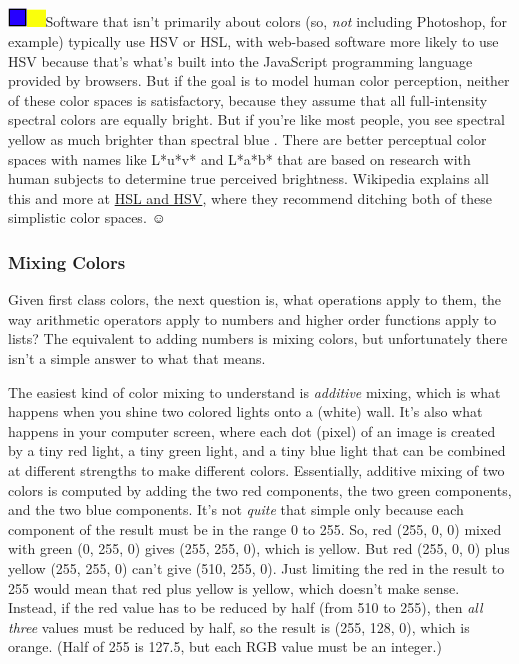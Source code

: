 \includegraphics[width=0.20278in,height=0.20278in]{media/image1205.png}\includegraphics[width=0.18889in,height=0.18889in]{media/image1206.png}Software
that isn't primarily about colors (so, \emph{not} including Photoshop,
for example) typically use HSV or HSL, with web-based software more
likely to use HSV because that's what's built into the JavaScript
programming language provided by browsers. But if the goal is to model
human color perception, neither of these color spaces is satisfactory,
because they assume that all full-intensity spectral colors are equally
bright. But if you're like most people, you see spectral yellow as much
brighter than spectral blue . There are better perceptual color spaces
with names like L*u*v* and L*a*b* that are based on research with human
subjects to determine true perceived brightness. Wikipedia explains all
this and more at \href{https://en.wikipedia.org/wiki/HSL_and_HSV}{HSL
and HSV}, where they recommend ditching both of these simplistic color
spaces. ☺

\subsubsection{\texorpdfstring{\hfill\break
Mixing Colors}{ Mixing Colors}}\label{mixing-colors}

Given first class colors, the next question is, what operations apply to
them, the way arithmetic operators apply to numbers and higher order
functions apply to lists? The equivalent to adding numbers is mixing
colors, but unfortunately there isn't a simple answer to what that
means.

The easiest kind of color mixing to understand is \emph{additive}
mixing, which is what happens when you shine two colored lights onto a
(white) wall. It's also what happens in your computer screen, where each
dot (pixel) of an image is created by a tiny red light, a tiny green
light, and a tiny blue light that can be combined at different strengths
to make different colors. Essentially, additive mixing of two colors is
computed by adding the two red components, the two green components, and
the two blue components. It's not \emph{quite} that simple only because
each component of the result must be in the range 0 to 255. So, red
(255, 0, 0) mixed with green (0, 255, 0) gives (255, 255, 0), which is
yellow. But red (255, 0, 0) plus yellow (255, 255, 0) can't give (510,
255, 0). Just limiting the red in the result to 255 would mean that red
plus yellow is yellow, which doesn't make sense. Instead, if the red
value has to be reduced by half (from 510 to 255), then \emph{all three}
values must be reduced by half, so the result is (255, 128, 0), which is
orange. (Half of 255 is 127.5, but each RGB value must be an integer.)


